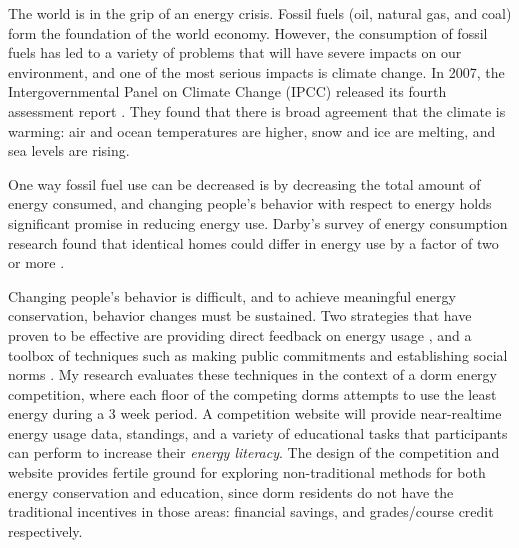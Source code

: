 \documentclass{chi-ext}
\begin{document}
\begin{multicols}{2}

The world is in the grip of an energy crisis. Fossil fuels (oil, natural gas, and coal) form the foundation of the world economy. However, the consumption of fossil fuels has led to a variety of problems that will have severe impacts on our environment, and one of the most serious impacts is climate change. In 2007, the Intergovernmental Panel on Climate Change (IPCC) released its fourth assessment report \cite{IPCC-synthesis-report-2007}. They found that there is broad agreement that the climate is warming: air and ocean temperatures are higher, snow and ice are melting, and sea levels are rising.

One way fossil fuel use can be decreased is by decreasing the total amount of energy consumed, and changing people's behavior with respect to energy holds significant promise in reducing energy use. Darby's survey of energy consumption research found that identical homes could differ in energy use by a factor of two or more \cite{darby-review-2006}.

Changing people's behavior is difficult, and to achieve meaningful energy conservation, behavior changes must be sustained. Two strategies that have proven to be effective are providing direct feedback on energy usage \cite{darby-review-2006}, and a toolbox of techniques such as making public commitments and establishing social norms \cite{McKenzie-Mohr2009}. My research evaluates these techniques in the context of a dorm energy competition, where each floor of the competing dorms attempts to use the least energy during a 3 week period. A competition website will provide near-realtime energy usage data, standings, and a variety of educational tasks that participants can perform to increase their \emph{energy literacy}. The design of the competition and website provides fertile ground for exploring non-traditional methods for both energy conservation and education, since dorm residents do not have the traditional incentives in those areas: financial savings, and grades/course credit respectively.


\end{multicols}
\end{document}
